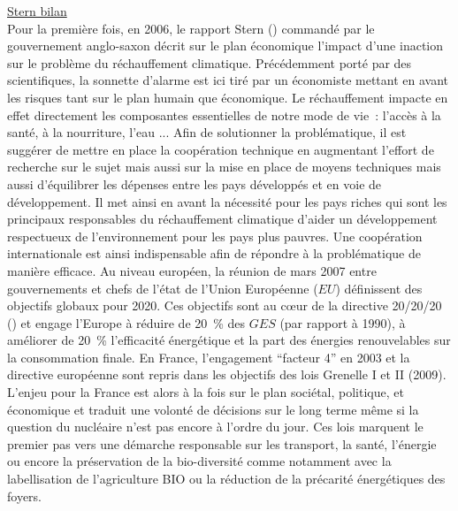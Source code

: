 \href{http://www.automatesintelligents.com/echanges/2006/nov/rapportstern.html}{Stern bilan}\\
Pour la première fois, en 2006, le rapport Stern () commandé par
le gouvernement anglo-saxon décrit sur le plan économique l’impact d’une inaction
sur le problème du réchauffement climatique. Précédemment porté par des scientifiques,
la sonnette d’alarme est ici tiré par un économiste mettant en avant les risques
tant sur le plan humain que économique. Le réchauffement impacte en effet directement
les composantes essentielles de notre mode de vie~: l’accès à la santé, à la nourriture,
l’eau ... Afin de solutionner la problématique, il est suggérer de mettre en place
la coopération technique en augmentant l’effort de recherche sur le sujet mais aussi
sur la mise en place de moyens techniques mais aussi d’équilibrer les dépenses
entre les pays développés et en voie de développement. Il met ainsi en avant la nécessité
pour les pays riches qui sont les principaux responsables du réchauffement climatique
d’aider un développement respectueux de l’environnement pour les pays plus pauvres.
Une coopération internationale est ainsi indispensable afin de répondre à la problématique
de manière efficace.
Au niveau européen, la réunion de mars 2007 entre gouvernements et chefs de l’état
de l’Union Européenne ($EU$) définissent des objectifs globaux pour 2020. Ces objectifs
sont au cœur de la directive 20/20/20 () et engage l’Europe à réduire
de \SI{20}{\percent} des $GES$ (par rapport à 1990), à améliorer de \SI{20}{\percent} l’efficacité énergétique et
la part des énergies renouvelables sur la consommation finale.
En France, l’engagement \enquote{facteur 4} en 2003 et la directive européenne sont
repris dans les objectifs des lois Grenelle I et II (2009). L’enjeu pour la France est
alors à la fois sur le plan sociétal, politique, et économique et traduit une volonté de décisions sur le
long terme même si la question du nucléaire n’est pas encore à l’ordre du jour. Ces lois
marquent le premier pas vers une démarche responsable sur les transport, la santé, l’énergie ou encore la préservation
de la bio-diversité comme notamment avec la labellisation de l’agriculture BIO ou
la réduction de la précarité énergétiques des foyers.

